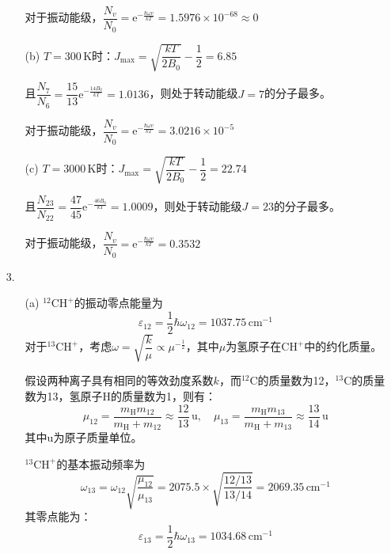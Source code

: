 \documentclass[a4paper]{article}
\renewcommand\epsilon\varepsilon
\begin{document}
\begin{enumerate}
\begin{enumerate}
        对于振动能级，$\dfrac{N_v}{N_0} = \mathrm{e}^{-\tfrac{\hbar\omega v}{kT}} = 1.5976 \times 10^{-68} \approx 0$

        \item[(b)]
        $T=300\,\mathrm{K}$时：$J_{\mathrm{max}} = \sqrt{\dfrac{kT}{2B_0}} -\dfrac{1}{2} = 6.85$

        且$\dfrac{N_7}{N_6} = \dfrac{15}{13}\mathrm{e}^{-\tfrac{14B_0}{kT}}=1.0136$，则处于转动能级$J = 7$的分子最多。
        
        对于振动能级，$\dfrac{N_v}{N_0} = \mathrm{e}^{-\tfrac{\hbar\omega v}{kT}} = 3.0216\times10^{-5}$

        \item[(c)]
        $T=3000\,\mathrm{K}$时：$J_{\mathrm{max}} = \sqrt{\dfrac{kT}{2B_0}} -\dfrac{1}{2} = 22.74$

        且$\dfrac{N_23}{N_22} = \dfrac{47}{45}\mathrm{e}^{-\tfrac{46B_0}{kT}}=1.0009$，则处于转动能级$J = 23$的分子最多。
        
        对于振动能级，$\dfrac{N_v}{N_0} = \mathrm{e}^{-\tfrac{\hbar\omega v}{kT}} = 0.3532$
    \end{enumerate}

    \bigskip
    \item[3.]
    \begin{enumerate}
        \item[(a)]
        $^{12}\mathrm{CH}^+$的振动零点能量为
        \[
            \epsilon_{12} = \frac{1}{2}\hbar\omega_{12} = 1037.75\,\mathrm{cm}^{-1}
        \]
        对于$^{13}\mathrm{CH}^+$，考虑$\omega = \sqrt{\dfrac{k}{\mu}} \propto \mu^{-\tfrac{1}{2}}$，其中$\mu$为氢原子在$\mathrm{CH}^+$中的约化质量。
    
        假设两种离子具有相同的等效劲度系数$k$，而$^{12}\mathrm{C}$的质量数为12，$^{13}\mathrm{C}$的质量数为13，氢原子$\mathrm{H}$的质量数为1，则有：
        \[
            \mu_{12} = \frac{m_\mathrm{H} m_{12}}{m_\mathrm{H} + m_{12}} \approx \frac{12}{13}\,\mathrm{u},\quad
            \mu_{13} = \frac{m_\mathrm{H} m_{13}}{m_\mathrm{H} + m_{13}} \approx \frac{13}{14}\,\mathrm{u}
        \]
        其中$\mathrm{u}$为原子质量单位。
    
        $^{13}\mathrm{CH}^+$的基本振动频率为
        \[
            \omega_{13} = \omega_{12}\sqrt{\frac{\mu_{12}}{\mu_{13}}} = 2075.5 \times \sqrt{\frac{12/13}{13/14}} = 2069.35\,\mathrm{cm^{-1}}
        \]
        其零点能为：
        \[
            \epsilon_{13} = \frac{1}{2}\hbar\omega_{13} = 1034.68\,\mathrm{cm}^{-1}
        \]
        

\end{enumerate}
\end{enumerate}
\end{document}
